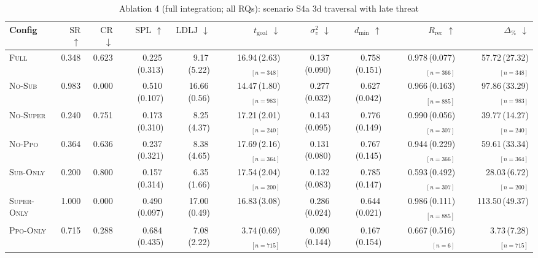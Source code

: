 \begin{table}[h]
\centering
\small
\caption{Ablation 4 (full integration; all RQs): scenario S4a 3d traversal with late threat}
\label{tab:abl4:S4a_3d_traversal_with_late_threat}
\begin{tabular}{lrrrrrrrrr}
\toprule
Config & $\mathrm{SR}$ $\uparrow$ & $\mathrm{CR}$ $\downarrow$ & $\mathrm{SPL}$ $\uparrow$ & $\mathrm{LDLJ}$ $\downarrow$ & $t_{\mathrm{goal}}$ $\downarrow$ & $\sigma^2_v$ $\downarrow$ & $d_{\min}$ $\uparrow$ & $R_{\mathrm{rec}}$ $\uparrow$ & $\Delta_{\%}$ $\downarrow$ \\
\midrule
\textsc{Full} & 0.348 & 0.623 & 0.225\,(0.313) & 9.17\,(5.22) & 16.94\,(2.63)$_{[n=348]}$ & 0.137\,(0.090) & 0.758\,(0.151) & 0.978\,(0.077)$_{[n=366]}$ & 57.72\,(27.32)$_{[n=348]}$ \\
\textsc{No-Sub} & 0.983 & 0.000 & 0.510\,(0.107) & 16.66\,(0.56) & 14.47\,(1.80)$_{[n=983]}$ & 0.277\,(0.032) & 0.627\,(0.042) & 0.966\,(0.163)$_{[n=885]}$ & 97.86\,(33.29)$_{[n=983]}$ \\
\textsc{No-Super} & 0.240 & 0.751 & 0.173\,(0.310) & 8.25\,(4.37) & 17.21\,(2.01)$_{[n=240]}$ & 0.143\,(0.095) & 0.776\,(0.149) & 0.990\,(0.056)$_{[n=307]}$ & 39.77\,(14.27)$_{[n=240]}$ \\
\textsc{No-Ppo} & 0.364 & 0.636 & 0.237\,(0.321) & 8.38\,(4.65) & 17.69\,(2.16)$_{[n=364]}$ & 0.131\,(0.080) & 0.767\,(0.145) & 0.944\,(0.229)$_{[n=366]}$ & 59.61\,(33.34)$_{[n=364]}$ \\
\textsc{Sub-Only} & 0.200 & 0.800 & 0.157\,(0.314) & 6.35\,(1.66) & 17.54\,(2.04)$_{[n=200]}$ & 0.132\,(0.083) & 0.785\,(0.147) & 0.593\,(0.492)$_{[n=307]}$ & 28.03\,(6.72)$_{[n=200]}$ \\
\textsc{Super-Only} & 1.000 & 0.000 & 0.490\,(0.097) & 17.00\,(0.49) & 16.83\,(3.08) & 0.286\,(0.024) & 0.644\,(0.021) & 0.986\,(0.111)$_{[n=885]}$ & 113.50\,(49.37) \\
\textsc{Ppo-Only} & 0.715 & 0.288 & 0.684\,(0.435) & 7.08\,(2.22) & 3.74\,(0.69)$_{[n=715]}$ & 0.090\,(0.144) & 0.167\,(0.154) & 0.667\,(0.516)$_{[n=6]}$ & 3.73\,(7.28)$_{[n=715]}$ \\
\bottomrule
\end{tabular}
\end{table}

